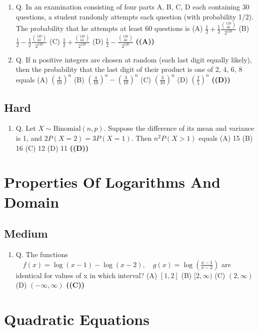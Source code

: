 \documentclass{article}
\begin{document}
\begin{enumerate}
4. one marble of each colour.
What is the smallest total number of marbles in the urn satisfying these conditions?
(A) 19
(B) 21
(C) 46
(D) 69 \hfill \textbf{((B))}
\item Q. In an examination consisting of four parts A, B, C, D each containing 30 questions, a student randomly attempts each question (with probability 1/2). The probability that he attempts at least 60 questions is
(A) $\frac{1}{2} + \frac{1}{2} \frac{\binom{120}{60}}{2^{120}}$
(B) $\frac{1}{2} - \frac{1}{2} \frac{\binom{120}{60}}{2^{120}}$
(C) $\frac{1}{2} + \frac{\binom{120}{60}}{2^{120}}$
(D) $\frac{1}{2} - \frac{\binom{120}{60}}{2^{120}}$ \hfill \textbf{((A))}
\item Q. If n positive integers are chosen at random (each last digit equally likely), then the probability that the last digit of their product is one of 2, 4, 6, 8 equals
(A) $(\frac{4}{10})^n$
(B) $(\frac{4}{10})^n - (\frac{3}{10})^n$
(C) $(\frac{3}{10})^n$
(D) $(\frac{2}{5})^n$ \hfill \textbf{((D))}
\end{enumerate}
\subsection{Hard}
\begin{enumerate}
\item Q. Let $X \sim \text{Binomial}(n,p)$. Suppose the difference of its mean and variance is 1, and $2 P(X = 2) = 3 P(X = 1)$. Then $n^2 P(X > 1)$ equals
(A) 15
(B) 16
(C) 12
(D) 11 \hfill \textbf{((D))}
\end{enumerate}
\section{Properties Of Logarithms And Domain}
\subsection{Medium}
\begin{enumerate}
\item Q. The functions
$\quad f(x) = \log(x - 1) - \log(x - 2),\quad g(x) = \log(\frac{x-1}{x-2})$
are identical for values of x in which interval?
(A) $[1,2]$
(B) $[2,\infty)$
(C) $(2,\infty)$
(D) $(-\infty,\infty)$ \hfill \textbf{((C))}
\end{enumerate}
\section{Quadratic Equations}
\end{document}
